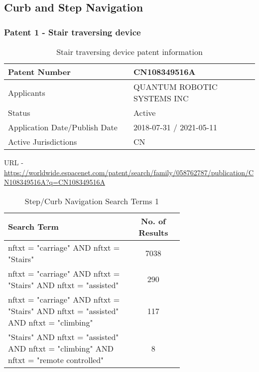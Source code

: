 \documentclass [12pt]{article}
\begin{document}
\subsection{Curb and Step Navigation}\label{sec:curb_step_navigation}
\subsubsection{Patent 1 - Stair traversing device}

\begin{table}[H]
    \centering
    \setlength{\arrayrulewidth}{1.5pt}
    \begin{tabular}{|p{0.5\linewidth}|p{0.5\linewidth}|}
    \hline
    Patent Number & CN108349516A\\
    \hline
    Applicants & QUANTUM ROBOTIC SYSTEMS INC\\
    \hline
    Status & Active\\
    \hline
    Application Date/Publish Date & 2018-07-31 / 2021-05-11\\
    \hline
    Active Jurisdictions & CN\\
    \hline
    \end{tabular}
    \caption{Stair traversing device patent information}
    \label{table:stair_traversing_device_patent_information}
\end{table}

URL - \url{https://worldwide.espacenet.com/patent/search/family/058762787/publication/CN108349516A?q=CN108349516A}

\begin{table}[H]
    \centering
    \setlength{\arrayrulewidth}{1.5pt}
    \begin{tabular}{|p{0.7\linewidth}|c|}
    \hline
    \cellcolor{gray!40}Search Term & \cellcolor{gray!40}No. of Results \\
    \hline
    nftxt = "carriage" AND nftxt = "Stairs" & 7038 \\
    \hline
    nftxt = "carriage" AND nftxt = "Stairs" AND nftxt = "assisted" & 290 \\
    \hline
    nftxt = "carriage" AND nftxt = "Stairs" AND nftxt = "assisted" AND nftxt = "climbing" & 117 \\
    \hline
    "Stairs" AND nftxt = "assisted" AND nftxt = "climbing" AND nftxt = "remote controlled" & 8 \\
    \hline
    \end{tabular}
    \caption{Step/Curb Navigation Search Terms 1}
    \label{table:step_curb_nav_st_1}
\end{table}
\end{document}
